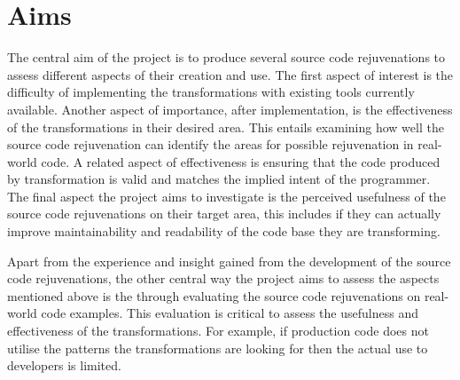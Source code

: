 \documentclass[bsc,frontabs,singlespacing,twoside,parskip,deptreport]{infthesis}
\begin{document}
% 






    



\section{Aims} %
The central aim of the project is to produce several source code rejuvenations to assess different aspects of their creation and use. The first aspect of interest is the difficulty of implementing the transformations with existing tools currently available. Another aspect of importance, after implementation, is the effectiveness of the transformations in their desired area. This entails examining how well the source code rejuvenation can identify the areas for possible rejuvenation in real-world code. A related aspect of effectiveness is ensuring that the code produced by transformation is valid and matches the implied intent of the programmer. The final aspect the project aims to investigate is the perceived usefulness of the source code rejuvenations on their target area, this includes if they can actually improve maintainability and readability of the code base they are transforming.

Apart from the experience and insight gained from the development of the source code rejuvenations, the other central way the project aims to assess the aspects mentioned above is the through evaluating the source code rejuvenations on real-world code examples. This evaluation is critical to assess the usefulness and effectiveness of the transformations. For example, if production code does not utilise the patterns the transformations are looking for then the actual use to developers is limited.
\end{document}

